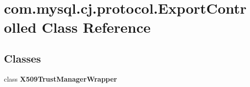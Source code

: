 \hypertarget{classcom_1_1mysql_1_1cj_1_1protocol_1_1_export_controlled}{}\section{com.\+mysql.\+cj.\+protocol.\+Export\+Controlled Class Reference}
\label{classcom_1_1mysql_1_1cj_1_1protocol_1_1_export_controlled}
\subsection*{Classes}
\begin{DoxyCompactItemize}
\item 
class {\bfseries X509\+Trust\+Manager\+Wrapper}
\end{DoxyCompactItemize}
